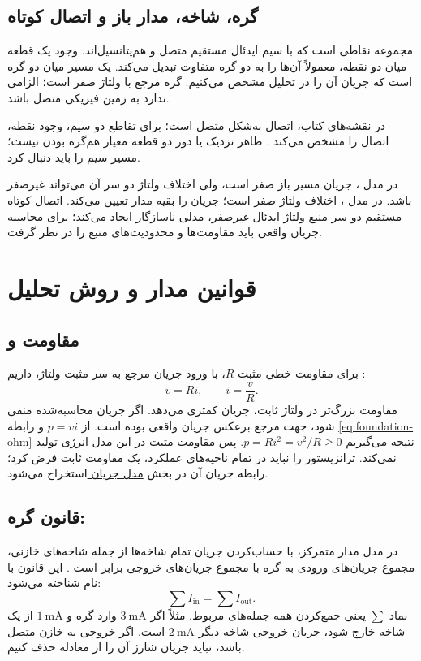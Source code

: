 \subsection{گره، شاخه، مدار باز و اتصال کوتاه}
 مجموعه نقاطی است که با سیم ایدئال مستقیم متصل و هم‌پتانسیل‌اند.
وجود یک قطعه میان دو نقطه، معمولاً آن‌ها را به دو گره متفاوت تبدیل می‌کند.
 یک مسیر میان دو گره است که جریان آن را در تحلیل مشخص می‌کنیم.
 گره مرجع با ولتاژ صفر است؛ الزامی ندارد به زمین فیزیکی متصل باشد.

در نقشه‌های کتاب، اتصال به‌شکل  متصل است؛ برای تقاطع دو سیم،
وجود نقطه، اتصال را مشخص می‌کند \cite[بخش ]{weste}.
ظاهر نزدیک یا دور دو قطعه معیار هم‌گره بودن نیست؛ مسیر سیم را باید دنبال کرد.

در مدل ، جریان مسیر باز صفر است، ولی اختلاف ولتاژ دو سر آن
می‌تواند غیرصفر باشد. در مدل ، اختلاف ولتاژ صفر است؛
جریان را بقیه مدار تعیین می‌کند. اتصال کوتاه مستقیم دو سر منبع ولتاژ ایدئال
غیرصفر، مدلی ناسازگار ایجاد می‌کند؛ برای محاسبه جریان واقعی باید مقاومت‌ها و
محدودیت‌های منبع را در نظر گرفت.

\section{قوانین مدار و روش تحلیل}
\subsection{مقاومت و }
برای مقاومت خطی مثبت \(R\)، با ورود جریان مرجع به سر مثبت ولتاژ، داریم
\cite{resistors}:
\begin{equation}\label{eq:foundation-ohm}
v=Ri,\qquad i=\frac{v}{R}.
\end{equation}
مقاومت بزرگ‌تر در ولتاژ ثابت، جریان کمتری می‌دهد.
اگر جریان محاسبه‌شده منفی شود، جهت مرجع برعکس جریان واقعی بوده است.
از \(p=vi\) و رابطه \eqref{eq:foundation-ohm} نتیجه می‌گیریم
\(p=Ri^2=v^2/R\ge0\). پس مقاومت مثبت در این مدل انرژی تولید نمی‌کند.
ترانزیستور را نباید در تمام ناحیه‌های عملکرد، یک مقاومت ثابت فرض کرد؛
رابطه جریان آن در بخش \hyperref[sec:book-mos-current]{مدل جریان } استخراج می‌شود.

\subsection{قانون گره: }
در مدل مدار متمرکز، با حساب‌کردن جریان تمام شاخه‌ها از جمله شاخه‌های خازنی،
مجموع جریان‌های ورودی به گره با مجموع جریان‌های خروجی برابر است
\cite{kirchhoff}. این قانون با نام  شناخته می‌شود:
\begin{equation}\label{eq:foundation-kcl}
\sum I_{\mathrm{in}}=\sum I_{\mathrm{out}}.
\end{equation}
نماد \(\sum\) یعنی جمع‌کردن همه جمله‌های مربوط.
مثلاً اگر \(\qty{3}{\milli\ampere}\) وارد گره و
\(\qty{1}{\milli\ampere}\) از یک شاخه خارج شود، جریان خروجی شاخه دیگر
\(\qty{2}{\milli\ampere}\) است. اگر خروجی به خازن متصل باشد، نباید
جریان شارژ آن را از معادله حذف کنیم.


